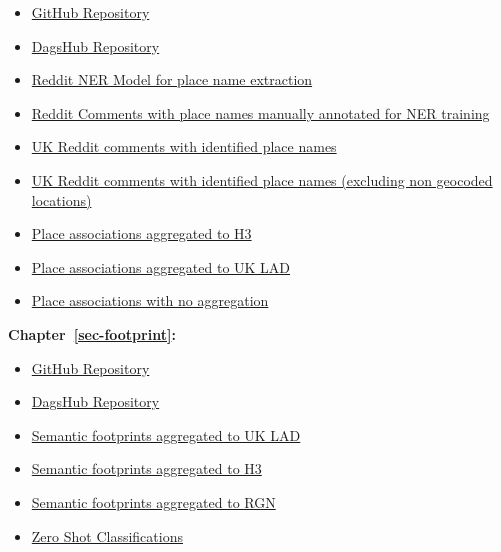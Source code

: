 \documentclass[
  letterpaper,
  11pt,
  english,
  onehalfspacing,
  headsepline]{MastersDoctoralThesis}
\providecommand{\tightlist}{%
  \setlength{\itemsep}{0pt}\setlength{\parskip}{0pt}}\usepackage{longtable,booktabs,array}
\begin{document}
\begin{itemize}
\tightlist
\item
  \href{https://github.com/cjber/reddit-connectivity}{GitHub Repository}
\item
  \href{https://dagshub.com/cjber/reddit-connectivity}{DagsHub
  Repository}
\item
  \href{https://huggingface.co/cjber/reddit-ner-place_names}{Reddit NER
  Model for place name extraction}
\item
  \href{https://github.com/cjber/reddit-model/blob/main/data/doccano_annotated.jsonl}{Reddit
  Comments with place names manually annotated for NER training}
\item
  \href{https://dagshub.com/cjber/reddit-connectivity/raw/52222d9ec58865abde56ccc238cf70204ce3e35a/data/out/places_full.parquet}{UK
  Reddit comments with identified place names}
\item
  \href{https://dagshub.com/cjber/reddit-connectivity/raw/52222d9ec58865abde56ccc238cf70204ce3e35a/data/out/places.parquet}{UK
  Reddit comments with identified place names (excluding non geocoded
  locations)}
\item
  \href{https://dagshub.com/cjber/reddit-connectivity/raw/52222d9ec58865abde56ccc238cf70204ce3e35a/data/out/pci_h3.parquet}{Place
  associations aggregated to H3}
\item
  \href{https://dagshub.com/cjber/reddit-connectivity/raw/52222d9ec58865abde56ccc238cf70204ce3e35a/data/out/pci_lad.parquet}{Place
  associations aggregated to UK LAD}
\item
  \href{https://dagshub.com/cjber/reddit-connectivity/raw/52222d9ec58865abde56ccc238cf70204ce3e35a/data/out/pci.parquet}{Place
  associations with no aggregation}
\end{itemize}

\textbf{Chapter~\ref{sec-footprint}:}

\begin{itemize}
\tightlist
\item
  \href{https://github.com/cjber/reddit-footprint}{GitHub Repository}
\item
  \href{https://dagshub.com/cjber/reddit-footprint}{DagsHub Repository}
\item
  \href{https://dagshub.com/cjber/reddit-footprint/raw/177a160406a9d92a39ba5110fa8ca5f3769e71cc/data/processed/lad_embeddings.parquet}{Semantic
  footprints aggregated to UK LAD}
\item
  \href{https://dagshub.com/cjber/reddit-footprint/raw/177a160406a9d92a39ba5110fa8ca5f3769e71cc/data/processed/h3_embeddings.parquet}{Semantic
  footprints aggregated to H3}
\item
  \href{https://dagshub.com/cjber/reddit-footprint/raw/177a160406a9d92a39ba5110fa8ca5f3769e71cc/data/processed/region_embeddings.parquet}{Semantic
  footprints aggregated to RGN}
\item
  \href{https://dagshub.com/cjber/reddit-footprint/src/main/data/processed/places_zero_shot.parquet}{Zero
  Shot Classifications}
\end{itemize}
\end{document}
